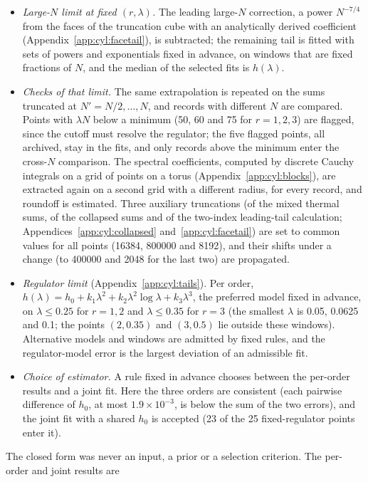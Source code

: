 \documentclass[11pt,a4paper]{article}
\numberwithin{equation}{section}
\newcommand{\sci}[2]{#1\times10^{#2}}
\begin{document}
\begin{itemize}
\item \emph{Large-$N$ limit at fixed $(r,\lambda)$.} The leading large-$N$ correction, a power $N^{-7/4}$ from the faces
 of the truncation cube with an analytically derived coefficient (Appendix~\ref{app:cyl:facetail}), is subtracted; the remaining tail is fitted with
 sets of powers and exponentials fixed in advance, on windows that are fixed fractions of $N$, and the median of the
 selected fits is $h(\lambda)$.
\item \emph{Checks of that limit.} The same extrapolation is repeated on the sums truncated at $N'=N/2,\dots,N$, and
 records with different $N$ are compared. Points with $\lambda N$ below a minimum (50, 60 and 75 for $r=1,2,3$) are
 flagged, since the cutoff must resolve the regulator; the five flagged points, all archived, stay in the fits, and
 only records above the minimum enter the cross-$N$ comparison. The spectral coefficients, computed by discrete Cauchy integrals on a grid of points on a
 torus (Appendix~\ref{app:cyl:blocks}), are extracted again on a second grid with a different radius, for every record, and roundoff is estimated. Three
 auxiliary truncations (of the mixed thermal sums, of the collapsed sums and of the two-index leading-tail
 calculation; Appendices~\ref{app:cyl:collapsed} and~\ref{app:cyl:facetail}) are set to common values for all points
 (16384, 800000 and 8192), and their shifts under a change (to 400000 and 2048 for the last two) are propagated.
\item \emph{Regulator limit} (Appendix~\ref{app:cyl:tails}). Per order, $h(\lambda)=h_0+k_1\lambda^2+k_2\lambda^2\log\lambda+k_3\lambda^3$, the
 preferred model fixed in advance, on $\lambda\le0.25$ for $r=1,2$ and $\lambda\le0.35$ for $r=3$ (the smallest
 $\lambda$ is 0.05, 0.0625 and 0.1; the points $(2,0.35)$ and $(3,0.5)$ lie outside these windows). Alternative models
 and windows are admitted by fixed rules, and the regulator-model error is the largest deviation of an admissible fit.
\item \emph{Choice of estimator.} A rule fixed in advance chooses between the per-order results and a joint fit. Here
 the three orders are consistent (each pairwise difference of $h_0$, at most $\sci{1.9}{-3}$, is below the sum of
 the two errors), and the joint fit with a shared $h_0$ is accepted (23 of the 25
 fixed-regulator points enter it).
\end{itemize}
The closed form was never an input, a prior or a selection criterion. The per-order and joint results are
\end{document}
